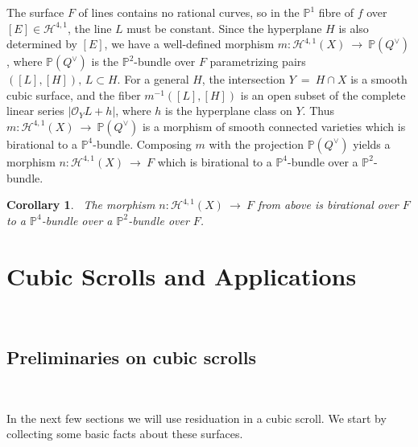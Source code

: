 \documentclass[twoside,12pt,reqno]{amsart}
\theoremstyle{plain}
\newtheorem{cor}[thm]{Corollary}
\theoremstyle{definition}
\newcommand{\Hdg}[2]{\mathcal{H}^{#1,#2}}
\newcommand{\PP}{\mathbb{P}}
\def\ps{\vspace{4pt}}
\newcommand{\OO}{\mathcal O}
\begin{document}
The surface $F$ of lines contains no rational curves, so in the $\PP^1$ fibre of
$f$ over $[E]\in\Hdg{4}{1}$, the line $L$ must be constant.  Since the 
hyperplane $H$ is also determined by $[E]$, we have a well-defined morphism
$m:\Hdg{4}{1}(X)~\rightarrow~ \PP(Q^\vee)$, where $\PP(Q^\vee)$ is the 
$\PP^2$-bundle over $F$ parametrizing pairs
$([L],[H]),\, L\subset H$.  For a general $H$, the intersection $Y~=~H\cap X$ is
a smooth cubic surface,  and the fiber $m^{-1}([L],[H])$ is an open
subset of the complete linear series $|\OO_Y{L+h}|$, where $h$ is the
hyperplane class on $Y$.  Thus $m:\Hdg{4}{1}(X)~\rightarrow~ \PP(Q^\vee)$
is a morphism of smooth connected varieties which is birational to a
$\PP^4$-bundle.  Composing $m$ with the projection $\PP(Q^\vee)$ yields
a morphism $n:\Hdg{4}{1}(X)~\rightarrow~ F$ which is birational to a
$\PP^4$-bundle over a $\PP^2$-bundle.  

\ps

\begin{cor}~\label{cor-41}
The morphism $n:\Hdg{4}{1}(X)~\rightarrow~ F$ from above is birational
over $F$ to a $\PP^4$-bundle over a $\PP^2$-bundle over $F$.
\end{cor}

\section{Cubic Scrolls and Applications}~\label{sec-cuscr}

\subsection{Preliminaries on cubic scrolls}~\label{subsec-prelim}

In the next few sections we will use residuation in a cubic 
scroll. We start by collecting 
some basic facts about these surfaces.

\ps
\end{document}
